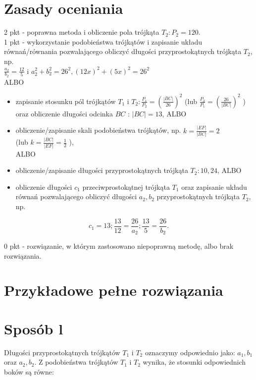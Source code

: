 \documentclass[10pt]{article}
\begin{document}
\section*{Zasady oceniania}
2 pkt - poprawna metoda i obliczenie pola trójkąta $T_{2}: P_{2}=120$.\\
1 pkt - wykorzystanie podobieństwa trójkątów i zapisanie układu równań/równania pozwalającego obliczyć długości przyprostokątnych trójkąta $T_{2}$, np.\\
$\frac{a_{2}}{b_{2}}=\frac{12}{5}$ i $a_{2}^{2}+b_{2}^{2}=26^{2},(12 x)^{2}+(5 x)^{2}=26^{2}$\\
ALBO

\begin{itemize}
  \item zapisanie stosunku pól trójkątów $T_{1}$ i $T_{2}: \frac{P_{1}}{P_{2}}=\left(\frac{|B C|}{26}\right)^{2}$ (lub $\frac{P_{2}}{P_{1}}=\left(\frac{26}{|B C|}\right)^{2}$ ) oraz obliczenie długości odcinka $B C$ : $|B C|=13$, ALBO
  \item obliczenie/zapisanie skali podobieństwa trójkątów, np. $k=\frac{|E F|}{|B C|}=2$\\
(lub $k=\frac{|B C|}{|E F|}=\frac{1}{2}$ ),\\
ALBO
  \item obliczenie/zapisanie długości przyprostokątnych trójkąta $T_{2}: 10,24$, ALBO
  \item obliczenie długości $c_{1}$ przeciwprostokątnej trójkąta $T_{1}$ oraz zapisanie układu równań pozwalającego obliczyć długości $a_{2}, b_{2}$ przyprostokątnych trójkąta $T_{2}$, np.
\end{itemize}

$$
c_{1}=13 ; \frac{13}{12}=\frac{26}{a_{2}} ; \frac{13}{5}=\frac{26}{b_{2}} .
$$

0 pkt - rozwiązanie, w którym zastosowano niepoprawną metodę, albo brak rozwiązania.

\section*{Przykładowe pełne rozwiązania}
\section*{Sposób l}
Długości przyprostokątnych trójkątów $T_{1}$ i $T_{2}$ oznaczymy odpowiednio jako: $a_{1}, b_{1}$ oraz $a_{2}, b_{2}$. Z podobieństwa trójkątów $T_{1}$ i $T_{2}$ wynika, że stosunki odpowiednich boków są równe:
\end{document}
